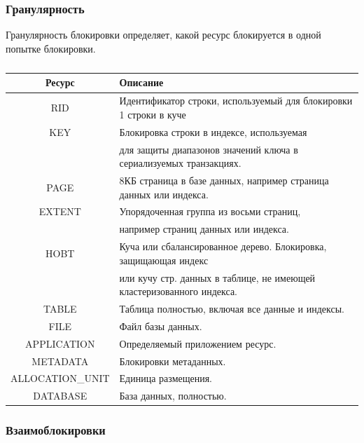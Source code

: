 \subsubsection{Гранулярность}

Гранулярность блокировки определяет, какой ресурс блокируется в одной попытке блокировки.

\begin{table}[ht!]
	\begin{center}
		\caption{}
		\label{tbl:gran}
		\begin{tabular}{|c|l|}
			\hline
			\textbf{Ресурс} & \textbf{Описание} \\
			\hline
			RID & Идентификатор строки, используемый для блокировки 1 строки в куче \\
			\hline
			KEY & Блокировка строки в индексе, используемая \\ & для защиты диапазонов значений ключа в
			сериализуемых транзакциях. \\
			\hline
			PAGE & 8КБ страница в базе данных, например страница данных или индекса. \\
			\hline
			EXTENT & Упорядоченная группа из восьми страниц, \\ & например страниц данных или индекса. \\
			\hline
			HOBT & Куча или сбалансированное дерево. Блокировка, защищающая индекс \\ & или кучу стр.
			данных в таблице, не имеющей кластеризованного индекса. \\
			\hline
			TABLE & Таблица полностью, включая все данные и индексы. \\
			\hline
			FILE & Файл базы данных. \\
			\hline
			APPLICATION & Определяемый приложением ресурс. \\
			\hline
			METADATA & Блокировки метаданных. \\
			\hline
			ALLOCATION\_UNIT & Единица размещения. \\
			\hline
			DATABASE & База данных, полностью. \\
			\hline
		\end{tabular}
	\end{center}
\end{table}
\FloatBarrier

\subsubsection{Взаимоблокировки}


